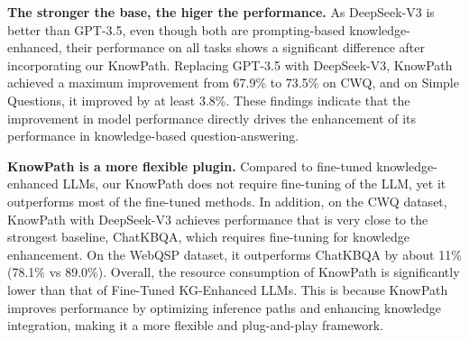 \textbf{The stronger the base, the higer the performance.}
As DeepSeek-V3 is better than GPT-3.5, even though both are prompting-based knowledge-enhanced, their performance on all tasks shows a significant difference after incorporating our KnowPath.
Replacing GPT-3.5 with DeepSeek-V3, KnowPath achieved a maximum improvement from 67.9\% to 73.5\% on CWQ, and on Simple Questions, it improved by at least 3.8\%.
These findings indicate that the improvement in model performance directly drives the enhancement of its performance in knowledge-based question-answering.


\textbf{KnowPath is a more flexible plugin.}
Compared to fine-tuned knowledge-enhanced LLMs, our KnowPath does not require fine-tuning of the LLM, yet it outperforms most of the fine-tuned methods.
In addition, on the CWQ dataset, KnowPath with DeepSeek-V3 achieves performance that is very close to the strongest baseline, ChatKBQA, which requires fine-tuning for knowledge enhancement. On the WebQSP dataset, it outperforms ChatKBQA by about 11\% (78.1\% vs 89.0\%).
Overall, the resource consumption of KnowPath is significantly lower than that of Fine-Tuned KG-Enhanced LLMs.
This is because KnowPath improves performance by optimizing inference paths and enhancing knowledge integration, making it a more flexible and plug-and-play framework.


